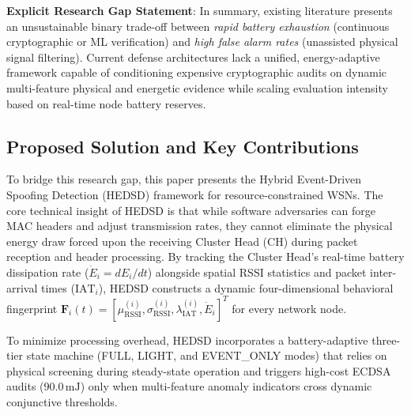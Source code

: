 \documentclass[conference]{IEEEtran}
\begin{document}
\textbf{Explicit Research Gap Statement}: In summary, existing literature presents an unsustainable binary trade-off between \textit{rapid battery exhaustion} (continuous cryptographic or ML verification) and \textit{high false alarm rates} (unassisted physical signal filtering). Current defense architectures lack a unified, energy-adaptive framework capable of conditioning expensive cryptographic audits on dynamic multi-feature physical and energetic evidence while scaling evaluation intensity based on real-time node battery reserves.

\subsection{Proposed Solution and Key Contributions}
To bridge this research gap, this paper presents the Hybrid Event-Driven Spoofing Detection (HEDSD) framework for resource-constrained WSNs. The core technical insight of HEDSD is that while software adversaries can forge MAC headers and adjust transmission rates, they cannot eliminate the physical energy draw forced upon the receiving Cluster Head (CH) during packet reception and header processing. By tracking the Cluster Head's real-time battery dissipation rate ($\dot{E}_i = dE_i/dt$) alongside spatial RSSI statistics and packet inter-arrival times ($\text{IAT}_i$), HEDSD constructs a dynamic four-dimensional behavioral fingerprint $\mathbf{F}_i(t) = [\mu_{\text{RSSI}}^{(i)}, \sigma_{\text{RSSI}}^{(i)}, \lambda_{\text{IAT}}^{(i)}, \dot{E}_i]^T$ for every network node.

To minimize processing overhead, HEDSD incorporates a battery-adaptive three-tier state machine (FULL, LIGHT, and EVENT\_ONLY modes) that relies on physical screening during steady-state operation and triggers high-cost ECDSA audits ($90.0\,\text{mJ}$) only when multi-feature anomaly indicators cross dynamic conjunctive thresholds.
\end{document}
